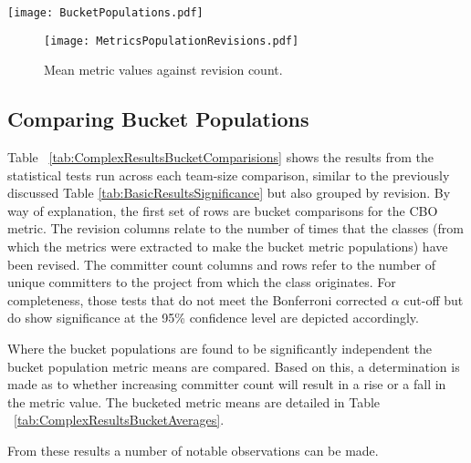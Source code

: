 \begin{table}
\centering 
{}
\begin{tabular}
 \centering 
 \texttt{[image: BucketPopulations.pdf]}
 \label{tab:BucketPopulations}
\end{tabular}
\end{table}

\begin{figure}[htbp!] 
\centering    
\texttt{[image: MetricsPopulationRevisions.pdf]}
\caption{Mean metric values against revision count.}
\label{fig:MetricsPopulationRevisions}
\end{figure}

\subsection{Comparing Bucket Populations}
Table ~\ref{tab:ComplexResultsBucketComparisions} shows the results from the statistical tests run across each team-size comparison, similar to the previously discussed Table \ref{tab:BasicResultsSignificance} but also grouped by revision. By way of explanation, the first set of rows are bucket comparisons for the CBO metric. The revision columns relate to the number of times that the classes (from which the metrics were extracted to make the bucket metric populations) have been revised. The committer count columns and rows refer to the number of unique committers to the project from which the class originates. For completeness, those tests that do not meet the Bonferroni corrected $\alpha$ cut-off but do show significance at the 95\% confidence level are depicted accordingly. 

Where the bucket populations are found to be significantly independent the bucket population metric means are compared. Based on this, a determination is made as to whether increasing committer count will result in a rise or a fall in the metric value. The bucketed metric means are detailed in Table ~\ref{tab:ComplexResultsBucketAverages}.

From these results a number of notable observations can be made. 

